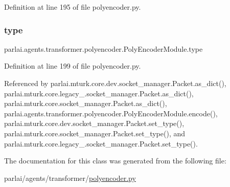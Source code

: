 Definition at line 195 of file polyencoder.\+py.

\mbox{\label{classparlai_1_1agents_1_1transformer_1_1polyencoder_1_1PolyEncoderModule_a3eea152c32cd33d1e6b0ca680887d0e7}} 
\subsubsection{\texorpdfstring{type}{type}}
{\footnotesize\ttfamily parlai.\+agents.\+transformer.\+polyencoder.\+Poly\+Encoder\+Module.\+type}



Definition at line 199 of file polyencoder.\+py.



Referenced by parlai.\+mturk.\+core.\+dev.\+socket\+\_\+manager.\+Packet.\+as\+\_\+dict(), parlai.\+mturk.\+core.\+legacy\+\_.\+socket\+\_\+manager.\+Packet.\+as\+\_\+dict(), parlai.\+mturk.\+core.\+socket\+\_\+manager.\+Packet.\+as\+\_\+dict(), parlai.\+agents.\+transformer.\+polyencoder.\+Poly\+Encoder\+Module.\+encode(), parlai.\+mturk.\+core.\+dev.\+socket\+\_\+manager.\+Packet.\+set\+\_\+type(), parlai.\+mturk.\+core.\+socket\+\_\+manager.\+Packet.\+set\+\_\+type(), and parlai.\+mturk.\+core.\+legacy\+\_.\+socket\+\_\+manager.\+Packet.\+set\+\_\+type().



The documentation for this class was generated from the following file\+:\begin{DoxyCompactItemize}
\item 
parlai/agents/transformer/\hyperlink{polyencoder_8py}{polyencoder.\+py}\end{DoxyCompactItemize}
